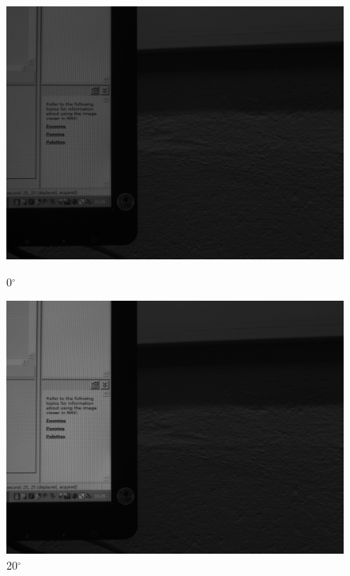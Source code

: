 \documentclass{article}
\begin{document}
\begin{figure}[H]
\centering
\begin{minipage}[b]{0.16\linewidth}
\includegraphics[width=1.0\textwidth,natwidth=100,natheight=100]{../LMS/im0.png}
  \caption{0$^\circ$}
  \label{fig:lms11-1}
\end{minipage}
\quad
\begin{minipage}[b]{0.16\linewidth}
\includegraphics[width=1.0\textwidth,natwidth=100,natheight=100]{../LMS/im20.png}
  \caption{20$^\circ$}
  \label{fig:lms11-2}
\end{minipage}
\quad
\begin{minipage}[b]{0.16\linewidth}

\end{minipage}
\end{figure}
\end{document}

